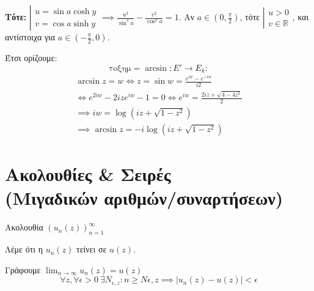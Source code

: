 \documentclass[12pt,a4paper,notitlepage,fleqn]{article}
\begin{document}
\begin{itemize}
\begin{itemize}
     	  	 \textbf{Τότε: } \(
     	  	 \left|
     	  	 \begin{array}{l}
     	  	 u = \sin a \cosh y \\ v = \cos a \sinh y
     	  	 \end{array}
     	  	  \right. \implies \boxed{ \frac{u^2}{\sin^2 a} - \frac{v^2}{\cos^2 a} = 1 }
     	  	  \). Αν \( a \in \left( 0,\frac{\pi}{2} \right) \), τότε \(
     	  	  \left| \begin{array}{l}
     	  	  u > 0 \\ v \in \mathbb R
     	  	  \end{array}  \right.
     	  	   \), και αντίστοιχα για \( a \in \left( -\frac{\pi}{2},0 \right) \).

     	  	   Έτσι ορίζουμε:
     	  	   \[
     	  	   \mathrm{τοξημ } = \arcsin: E' \to E_k:
     	  	   \]
     	  	   \begin{gather*}
     	  	   \arcsin z = w \iff z = \sin w = \frac{e^{iw}-e^{-iw}}{i2} \\
     	  	   \iff e^{2iw}-2ize^{iw}-1 = 0 \iff e^{iw} = \frac{2iz+\sqrt{4-4z^2}}{2}
     	  	   \\ \implies iw = \log\left( iz+\sqrt{1-z^2} \right) \\
     	  	   \implies \boxed{
     	  	   	\arcsin z = -i\log\left(
     	  	   	iz+\sqrt{1-z^2}
     	  	   	\right)
     	  	   	}
     	  	   \end{gather*}
     	  \end{itemize}

     \end{itemize}

     \section{Ακολουθίες \& Σειρές\\(Μιγαδικών αριθμών/συναρτήσεων)}
     \begin{defn*}{}
     	Ακολουθία \(\displaystyle \left( u_n(z) \right)_{n=1}^\infty \)
     \end{defn*}
     \begin{defn*}{}
     	Λέμε ότι η \( u_n(z) \) τείνει σε \( u(z) \).

     	Γράφουμε \( \displaystyle \lim_{n\to \infty} u_n(z)=u(z) \)
     	\[
     	\forall z,\forall\epsilon > 0 \ \exists N_{\epsilon,z}:
     	n \geq N{\epsilon,z} \implies \left| u_n(z)-u(z) \right|<\epsilon
     	\]
     \end{defn*}
\end{document}
